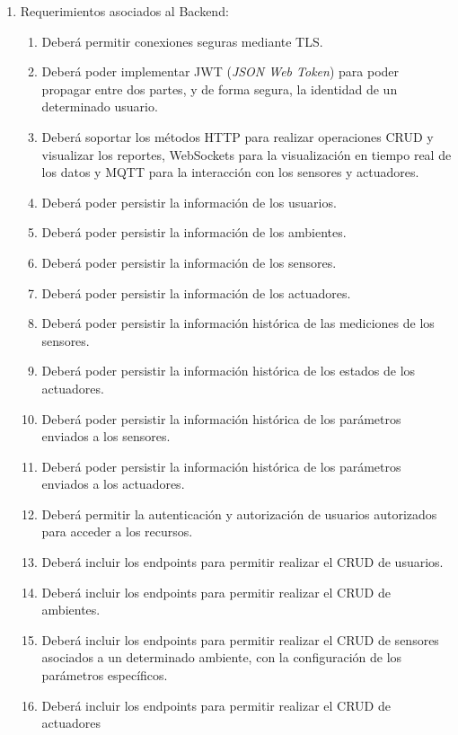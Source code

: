\begin{enumerate}
	\item Requerimientos asociados al Backend:
	      \begin{enumerate}
		      \item Deberá permitir conexiones seguras mediante TLS.
		      \item Deberá poder implementar JWT (\textit{JSON Web Token}) para poder propagar
		            entre dos partes, y de forma segura, la identidad de un determinado usuario.
		      \item Deberá soportar los métodos HTTP para realizar operaciones CRUD y visualizar
		            los reportes, WebSockets para la visualización en tiempo real de los datos y
		            MQTT para la interacción con los sensores y actuadores.
		      \item Deberá poder persistir la información de los usuarios.
		      \item Deberá poder persistir la información de los ambientes.
		      \item Deberá poder persistir la información de los sensores.
		      \item Deberá poder persistir la información de los actuadores.
		      \item Deberá poder persistir la información histórica de las mediciones de los
		            sensores.
		      \item Deberá poder persistir la información histórica de los estados de los
		            actuadores.
		      \item Deberá poder persistir la información histórica de los parámetros enviados a
		            los sensores.
		      \item Deberá poder persistir la información histórica de los parámetros enviados a
		            los actuadores.
		      \item Deberá permitir la autenticación y autorización de usuarios autorizados para
		            acceder a los recursos.
		      \item Deberá incluir los endpoints para permitir realizar el CRUD de usuarios.
		      \item Deberá incluir los endpoints para permitir realizar el CRUD de ambientes.
		      \item Deberá incluir los endpoints para permitir realizar el CRUD de sensores
		            asociados a un determinado ambiente, con la configuración de los parámetros
		            específicos.
		      \item Deberá incluir los endpoints para permitir realizar el CRUD de actuadores

\end{enumerate}
\end{enumerate}

